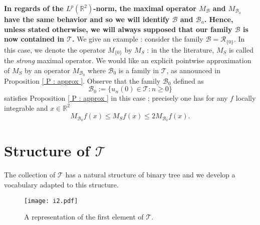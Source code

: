 \documentclass{article}
\begin{document}
\textbf{In regards of the $L^p(\mathbb{R}^2)$-norm, the maximal operator $M_\mathcal{B}$ and $M_{\mathcal{B}_a}$ have the same behavior and so we will identify $\mathcal{B}$ and $\mathcal{B}_a$. Hence, unless stated otherwise, we will always supposed that our family $\mathcal{B}$ is now contained in $\mathcal{T}$.} We give an example : consider the family $\mathcal{B} = \mathcal{R}_{\{0\}}$. In this case, we denote the operator $M_{\{0\}}$ by $M_S$ : in the the literature, $M_S$ is called the \textit{strong} maximal operator. We would like an explicit pointwise approximation of $M_S$ by an operator $M_{\mathcal{B}_0}$ where $\mathcal{B}_0$ is a family in $\mathcal{T}$, as announced in Proposition \ref{ P : approx }. Observe that the family $\mathcal{B}_0$ defined as $$\mathcal{B}_0 := \{ u_n(0) \in \mathcal{T} : n \geq 0 \}$$ satisfies Proposition \ref{ P : approx } in this case ; precisely one has for any $f$ locally integrable and $x \in \mathbb{R}^2$ $$M_{\mathcal{B}_0 } f(x) \leq M_S f(x) \leq 2 M_{\mathcal{B}_0 } f(x).$$























\section{Structure of $\mathcal{T}$}\label{ S : structure }


The collection of $\mathcal{T}$ has a natural structure of binary tree and we develop a vocabulary adapted to this structure.




\begin{figure}[h!]
\centering
\texttt{[image: i2.pdf]}
\caption{A representation of the first element of $\mathcal{T}$.}  
\end{figure}
\end{document}

